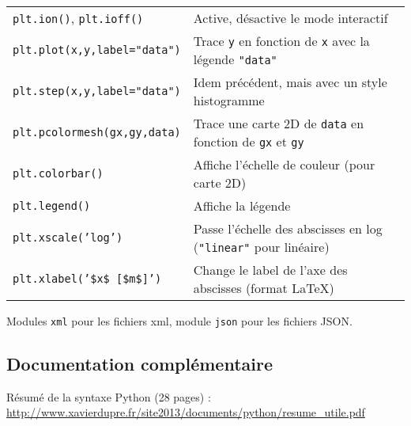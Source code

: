 \documentclass{article}
\begin{document}
\begin{tabular}{|l|l|}
    \texttt{plt.ion()}, \texttt{plt.ioff()}     & Active, désactive le mode interactif\\
    \texttt{plt.plot(x,y,label="data")}         & Trace \texttt{y} en fonction de \texttt{x} avec la légende \texttt{"data"}\\
    \texttt{plt.step(x,y,label="data")}         & Idem précédent, mais avec un style histogramme\\
    \texttt{plt.pcolormesh(gx,gy,data)}         & Trace une carte 2D de \texttt{data} en fonction de \texttt{gx} et \texttt{gy}\\
    \texttt{plt.colorbar()}                     & Affiche l'échelle de couleur (pour carte 2D)\\
    \texttt{plt.legend()}                       & Affiche la légende\\
    \texttt{plt.xscale('log')}                  & Passe l'échelle des abscisses en log (\texttt{"linear"} pour linéaire)\\
    \texttt{plt.xlabel('\$x\$ [\$m\$]')}        & Change le label de l'axe des abscisses (format LaTeX)\\
    \hline
\end{tabular}

Modules \texttt{xml} pour les fichiers xml, module \texttt{json} pour les fichiers JSON.

\subsection*{Documentation complémentaire}

Résumé de la syntaxe Python (28 pages) :\\ \url{http://www.xavierdupre.fr/site2013/documents/python/resume_utile.pdf}





\end{document}
